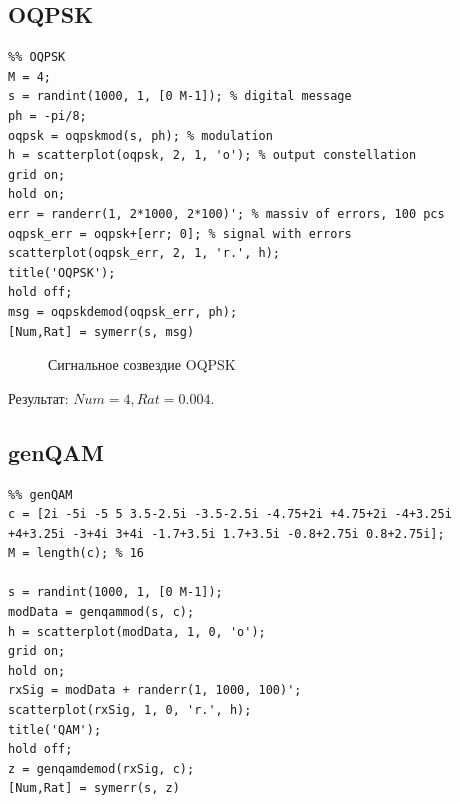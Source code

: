 \documentclass[a4paper,14pt]{article}
\begin{document}
\newpage

\subsection{OQPSK}

\begin{lstlisting}
%% OQPSK
M = 4;
s = randint(1000, 1, [0 M-1]); % digital message
ph = -pi/8;
oqpsk = oqpskmod(s, ph); % modulation
h = scatterplot(oqpsk, 2, 1, 'o'); % output constellation
grid on;
hold on;
err = randerr(1, 2*1000, 2*100)'; % massiv of errors, 100 pcs
oqpsk_err = oqpsk+[err; 0]; % signal with errors
scatterplot(oqpsk_err, 2, 1, 'r.', h);
title('OQPSK');
hold off;
msg = oqpskdemod(oqpsk_err, ph);
[Num,Rat] = symerr(s, msg)
\end{lstlisting}

\begin{figure}[bh]
\noindent{}
\caption{Сигнальное созвездие OQPSK}
\label{figCurves}
\end{figure}
Результат: $Num=4, Rat=0.004$.

\newpage

\subsection{genQAM}
\begin{lstlisting}
%% genQAM
c = [2i -5i -5 5 3.5-2.5i -3.5-2.5i -4.75+2i +4.75+2i -4+3.25i +4+3.25i -3+4i 3+4i -1.7+3.5i 1.7+3.5i -0.8+2.75i 0.8+2.75i];
M = length(c); % 16

s = randint(1000, 1, [0 M-1]);
modData = genqammod(s, c);
h = scatterplot(modData, 1, 0, 'o');
grid on;
hold on;
rxSig = modData + randerr(1, 1000, 100)';
scatterplot(rxSig, 1, 0, 'r.', h);
title('QAM');
hold off;
z = genqamdemod(rxSig, c);
[Num,Rat] = symerr(s, z)
\end{lstlisting}
\end{document}

